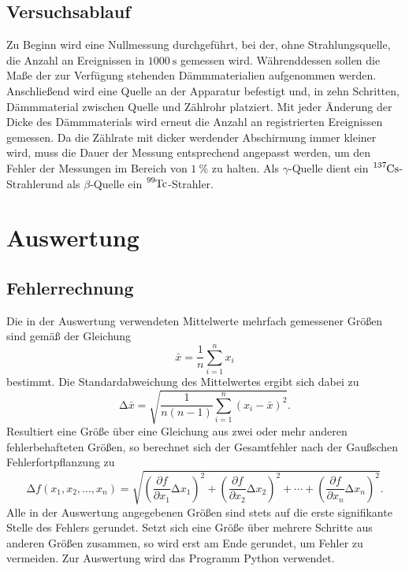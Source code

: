 \documentclass[
  bibliography=totoc,     %
  captions=tableheading,  %
  titlepage=firstiscover, %
]{scrartcl}
\begin{document}
\subsection{Versuchsablauf}
Zu Beginn wird eine Nullmessung durchgeführt, bei der, ohne Strahlungsquelle,
die Anzahl an Ereignissen in $\SI{1000}{\second}$ gemessen wird.
Währenddessen sollen die Maße der zur Verfügung stehenden Dämmmaterialien
aufgenommen werden. Anschließend wird eine Quelle an der Apparatur befestigt
und, in zehn Schritten, Dämmmaterial zwischen Quelle und Zählrohr platziert.
Mit jeder Änderung der Dicke des Dämmmaterials wird erneut die Anzahl an
registrierten Ereignissen gemessen. Da die Zählrate mit dicker werdender
Abschirmung immer kleiner wird, muss die Dauer der Messung entsprechend
angepasst werden, um den Fehler der Messungen im Bereich von $\SI{1}{\percent}$
zu halten. Als $\gamma$-Quelle dient ein $\ce{^{137}Cs}$-Strahlerund als
$\beta$-Quelle ein $\ce{^{99}Tc}$-Strahler.
\section{Auswertung}
\label{sec:auswertung}
\subsection{Fehlerrechnung}
\label{sec:fehlerrechnung}
Die in der Auswertung verwendeten Mittelwerte mehrfach gemessener Größen sind gemäß der
Gleichung
\begin{equation}
\bar{x}=\frac{1}{n}\sum_{i=1}^n x_i
\label{eqn:mittelwert}
\end{equation}
bestimmt. Die Standardabweichung des Mittelwertes ergibt sich dabei zu
\begin{equation}
\mathup{\Delta}\bar{x}=\sqrt{\frac{1}{n(n-1)}\sum_{i=1}^n\left(x_i-\bar{x}\right)^2}.
\label{eqn:standardabweichung}
\end{equation}
Resultiert eine Größe über eine Gleichung aus zwei oder mehr anderen fehlerbehafteten Größen, so
berechnet sich der Gesamtfehler nach der Gaußschen Fehlerfortpflanzung zu
\begin{equation}
\mathup{\Delta}f(x_1,x_2,...,x_n)=\sqrt{\left(\frac{\partial f}{\partial x_1}\mathup{\Delta}x_1\right)^2+\left(\frac{\partial f}{\partial x_2}\mathup{\Delta}x_2\right)^2+ \dotsb +\left(\frac{\partial f}{\partial x_n}\mathup{\Delta}x_n\right)^2}.
\label{eqn:fehlerfortpflanzung}
\end{equation}
Alle in der Auswertung angegebenen Größen sind stets auf die erste signifikante Stelle des
Fehlers gerundet. Setzt sich eine Größe über mehrere Schritte aus anderen Größen zusammen,
so wird erst am Ende gerundet, um Fehler zu vermeiden. Zur Auswertung wird das Programm
Python verwendet.
\end{document}
